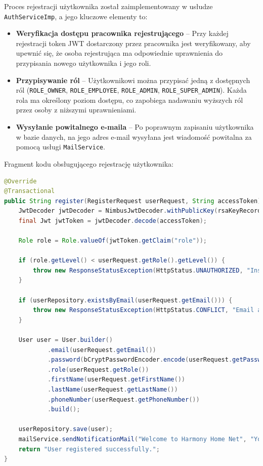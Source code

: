 Proces rejestracji użytkownika został zaimplementowany w usłudze \texttt{AuthServiceImp}, a jego kluczowe elementy to:
\begin{itemize}
    \item \textbf{Weryfikacja dostępu pracownika rejestrującego} -- Przy każdej rejestracji token JWT dostarczony przez pracownika jest weryfikowany, aby upewnić się, że osoba rejestrująca ma odpowiednie uprawnienia do przypisania nowego użytkownika i jego roli.
    \item \textbf{Przypisywanie ról} -- Użytkownikowi można przypisać jedną z dostępnych ról (\texttt{ROLE\_OWNER}, \texttt{ROLE\_EMPLOYEE}, \texttt{ROLE\_ADMIN}, \texttt{ROLE\_SUPER\_ADMIN}). Każda rola ma określony poziom dostępu, co zapobiega nadawaniu wyższych ról przez osoby z niższymi uprawnieniami.
    \item \textbf{Wysyłanie powitalnego e-maila} -- Po poprawnym zapisaniu użytkownika w bazie danych, na jego adres e-mail wysyłana jest wiadomość powitalna za pomocą usługi \texttt{MailService}.
\end{itemize}

Fragment kodu obsługującego rejestrację użytkownika:
\begin{lstlisting}[language=Java, caption=Rejestracja użytkownika w \texttt{AuthServiceImp}]
@Override
@Transactional
public String register(RegisterRequest userRequest, String accessToken) {
    JwtDecoder jwtDecoder = NimbusJwtDecoder.withPublicKey(rsaKeyRecord.publicKey()).build();
    final Jwt jwtToken = jwtDecoder.decode(accessToken);

    Role role = Role.valueOf(jwtToken.getClaim("role"));

    if (role.getLevel() < userRequest.getRole().getLevel()) {
        throw new ResponseStatusException(HttpStatus.UNAUTHORIZED, "Insufficient permissions to update or assign the role");
    }

    if (userRepository.existsByEmail(userRequest.getEmail())) {
        throw new ResponseStatusException(HttpStatus.CONFLICT, "Email already exists");
    }

    User user = User.builder()
            .email(userRequest.getEmail())
            .password(bCryptPasswordEncoder.encode(userRequest.getPassword()))
            .role(userRequest.getRole())
            .firstName(userRequest.getFirstName())
            .lastName(userRequest.getLastName())
            .phoneNumber(userRequest.getPhoneNumber())
            .build();

    userRepository.save(user);
    mailService.sendNotificationMail("Welcome to Harmony Home Net", "Your account has been successfully created.", user.getEmail());
    return "User registered successfully.";
}
\end{lstlisting}

